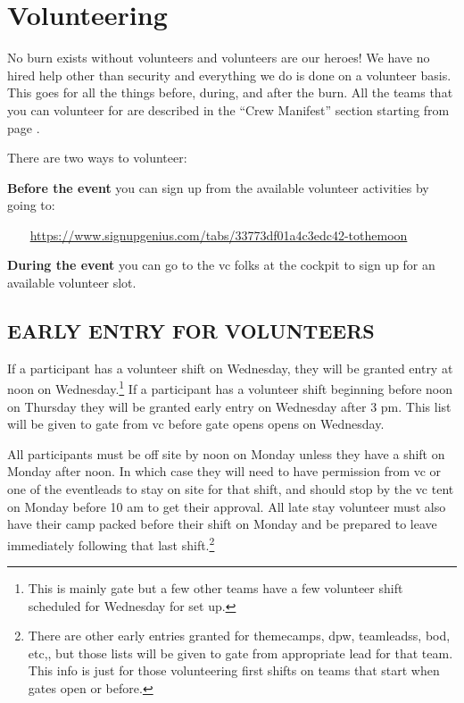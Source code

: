 %
%
%

\chapter{Volunteering}
\label{ch:volunteering}

\ifisflight
\putchapterthumb
\fi

No burn exists without volunteers and volunteers are our heroes! We have no hired help other than security and everything we do is done on a volunteer basis.  This goes for all the things before, during, and after the burn.  All the teams that you can volunteer for are described in the ``Crew Manifest'' section starting from page \pageref{ch:teams}.

There are two ways to volunteer:

\textbf{Before the event} you can sign up from the available volunteer activities by going to:

{\indent ~~~ \url{https://www.signupgenius.com/tabs/33773df01a4c3edc42-tothemoon} }

\textbf{During the event} you can go to the \gls{vc} folks at the \gls{cockpit} to sign up for an available volunteer slot.

\section*{EARLY ENTRY FOR VOLUNTEERS}

If a participant has a volunteer shift on Wednesday, they will be granted entry at noon on Wednesday.\footnote{This is mainly \gls{gate} but a few other teams have a few volunteer shift scheduled for Wednesday for set up.}  If a participant has a volunteer shift beginning before noon on Thursday they will be granted early entry on Wednesday after 3 pm.  This list will be given to \gls{gate} from \gls{vc} before \gls{gate} opens opens on Wednesday.

All participants must be off site by noon on Monday unless they have a shift on Monday after noon. In which case they will need to have permission from \gls{vc} or one of the \gls{eventleads} to stay on site for that shift, and should stop by the \gls{vc} tent on Monday before 10 am to get their approval. All late stay volunteer must also have their camp packed before their shift on Monday and be prepared to leave immediately following that last shift.\footnote{There are other early entries granted for \glspl{themecamp}, \gls{dpw}, \glspl{teamleads}, \gls{bod}, etc,,  but those lists will be given to \gls{gate} from appropriate lead for that team. This info is just for those volunteering first shifts on teams that start when gates open or before.}


